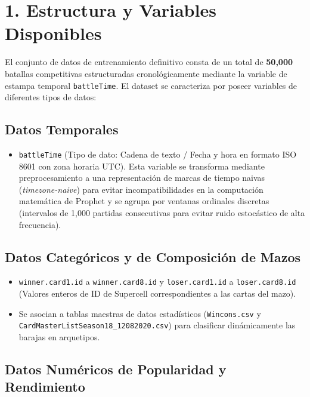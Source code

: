 \documentclass[
  spanish,
  12pt,
]{report}
\providecommand{\tightlist}{%
  \setlength{\itemsep}{0pt}\setlength{\parskip}{0pt}}
\begin{document}
\section{1. Estructura y Variables
Disponibles}\label{estructura-y-variables-disponibles}

El conjunto de datos de entrenamiento definitivo consta de un total de
\textbf{50,000} batallas competitivas estructuradas cronológicamente
mediante la variable de estampa temporal \texttt{battleTime}. El dataset
se caracteriza por poseer variables de diferentes tipos de datos:

\subsection{Datos Temporales}\label{datos-temporales}

\begin{itemize}
\tightlist
\item
  \texttt{battleTime} (Tipo de dato: Cadena de texto / Fecha y hora en
  formato ISO 8601 con zona horaria UTC). Esta variable se transforma
  mediante preprocesamiento a una representación de marcas de tiempo
  naivas (\emph{timezone-naive}) para evitar incompatibilidades en la
  computación matemática de Prophet y se agrupa por ventanas ordinales
  discretas (intervalos de 1,000 partidas consecutivas para evitar ruido
  estocástico de alta frecuencia).
\end{itemize}

\subsection{Datos Categóricos y de Composición de
Mazos}\label{datos-categuxf3ricos-y-de-composiciuxf3n-de-mazos}

\begin{itemize}
\tightlist
\item
  \texttt{winner.card1.id} a \texttt{winner.card8.id} y
  \texttt{loser.card1.id} a \texttt{loser.card8.id} (Valores enteros de
  ID de Supercell correspondientes a las cartas del mazo).
\item
  Se asocian a tablas maestras de datos estadísticos
  (\texttt{Wincons.csv} y \texttt{CardMasterListSeason18\_12082020.csv})
  para clasificar dinámicamente las barajas en arquetipos.
\end{itemize}

\subsection{Datos Numéricos de Popularidad y
Rendimiento}\label{datos-numuxe9ricos-de-popularidad-y-rendimiento}
\end{document}
